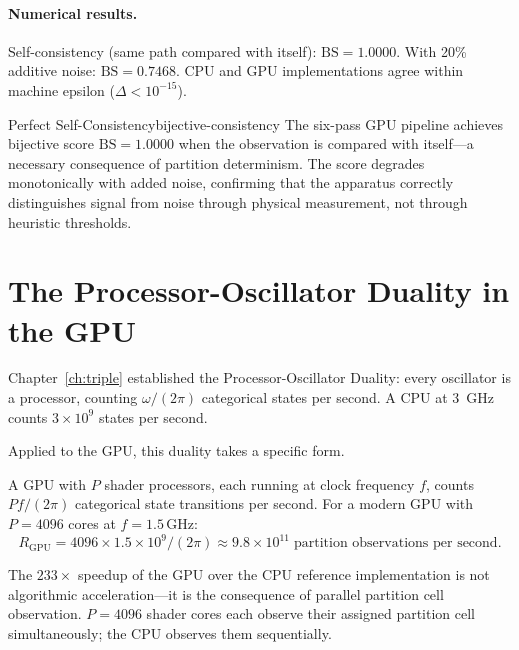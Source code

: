 \paragraph{Numerical results.}
Self-consistency (same path compared with itself): $\mathrm{BS} = 1.0000$.
With 20\% additive noise: $\mathrm{BS} = 0.7468$.  CPU and GPU implementations
agree within machine epsilon ($\Delta < 10^{-15}$).

\begin{consequence}{Perfect Self-Consistency}{bijective-consistency}
  The six-pass GPU pipeline achieves bijective score $\mathrm{BS} = 1.0000$
  when the observation is compared with itself---a necessary consequence of
  partition determinism.  The score degrades monotonically with added noise,
  confirming that the apparatus correctly distinguishes signal from noise
  through physical measurement, not through heuristic thresholds.
\end{consequence}

\section{The Processor-Oscillator Duality in the GPU}
\label{sec:ch22-proc-osc}

Chapter~\ref{ch:triple} established the Processor-Oscillator Duality: every
oscillator is a processor, counting $\omega/(2\pi)$ categorical states per
second.  A CPU at 3~GHz counts $3\times 10^9$ states per second.

Applied to the GPU, this duality takes a specific form.

\begin{theorem}
\label{thm:ch22-gpu-counter}
  A GPU with $P$ shader processors, each running at clock frequency $f$,
  counts $Pf/(2\pi)$ categorical state transitions per second.  For a
  modern GPU with $P = 4096$ cores at $f = 1.5\,\mathrm{GHz}$:
  \begin{equation}
    R_{\mathrm{GPU}} = 4096 \times 1.5 \times 10^9 / (2\pi)
      \approx 9.8 \times 10^{11}\;\text{partition observations per second.}
  \end{equation}
\end{theorem}

The $233\times$ speedup of the GPU over the CPU reference implementation is
not algorithmic acceleration---it is the consequence of parallel partition
cell observation.  $P = 4096$ shader cores each observe their assigned
partition cell simultaneously; the CPU observes them sequentially.

